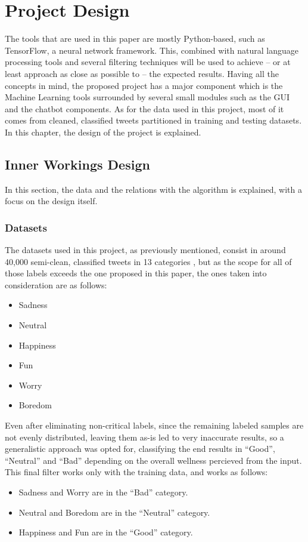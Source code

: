 \chapter{Project Design}
\label{ch4}
The tools that are used in this paper are mostly Python-based, such as TensorFlow, a neural network framework. This, combined with natural language processing tools and several filtering techniques will be used to achieve -- or at least approach as close as possible to -- the expected results.
Having all the concepts in mind, the proposed project has a major component which is the Machine Learning tools surrounded by several small modules such as the GUI and the chatbot components.
As for the data used in this project, most of it comes from cleaned, classified tweets partitioned in training and testing datasets.
In this chapter, the design of the project is explained.

\section{Inner Workings Design}
In this section, the data and the relations with the algorithm is explained, with a focus on the design itself.
\subsection{Datasets}
The datasets used in this project, as previously mentioned, consist in around 40,000 semi-clean, classified tweets in 13 categories \citep{rf20}, but as the scope for all of those labels exceeds the one proposed in this paper, the ones taken into consideration are as follows:
\begin{itemize}
	\item Sadness
	\item Neutral
	\item Happiness
	\item Fun
	\item Worry
	\item Boredom
\end{itemize}
Even after eliminating non-critical labels, since the remaining  labeled samples are not evenly distributed, leaving them as-is led to very inaccurate results, so a generalistic approach was opted for, classifying the end results in ``Good'', ``Neutral'' and ``Bad'' depending on the overall wellness percieved from the input.
This final filter works only with the training data, and works as follows:
\begin{itemize}
	\item Sadness and Worry are in the ``Bad'' category.
	\item Neutral and Boredom are in the ``Neutral'' category.
	\item Happiness and Fun are in the ``Good'' category.
\end{itemize}

